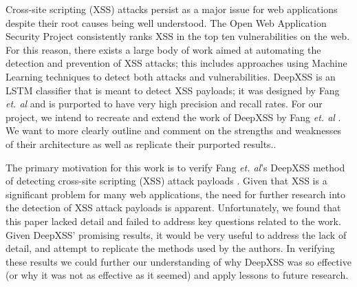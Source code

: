 Cross-site scripting (XSS) attacks persist as a major issue for web applications despite their root causes being well understood. The Open Web Application Security Project consistently ranks XSS in the top ten vulnerabilities on the web. For this reason, there exists a large body of work aimed at automating the detection and prevention of XSS attacks; this includes approaches using Machine Learning techniques to detect both attacks and vulnerabilities. DeepXSS is an LSTM classifier that is meant to detect XSS payloads; it was designed by Fang \textit{et. al} and is purported to have very high precision and recall rates. For our project, we intend to recreate and extend the work of DeepXSS by Fang \textit{et. al} \cite{fang2018deepxss}. We want to more clearly outline and comment on the strengths and weaknesses of their architecture as well as replicate their purported results.\cite{fang2018deepxss}. 

The primary motivation for this work is to verify Fang \textit{et. al}'s DeepXSS method of detecting cross-site scripting (XSS) attack payloads \cite{fang2018deepxss}. Given that XSS is a significant problem for many web applications, the need for further research into the detection of XSS attack payloads is apparent.  Unfortunately, we found that this paper lacked detail and failed to address key questions related to the work.  Given DeepXSS' promising results, it would be very useful to address the lack of detail, and attempt to replicate the methods used by the authors.  In verifying these results we could further our understanding of why DeepXSS was so effective (or why it was not as effective as it seemed) and apply lessons to future research.